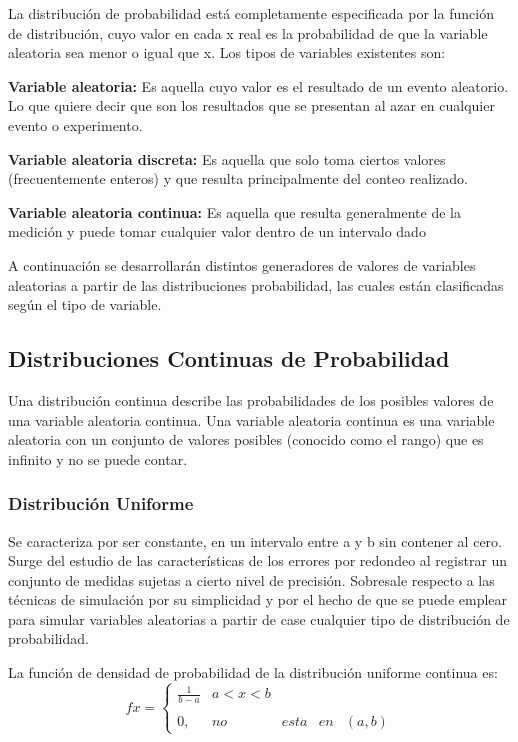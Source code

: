 \documentclass{article}
\begin{document}
    La distribución de probabilidad está completamente especificada por la función de distribución, cuyo valor en cada x
    real es la probabilidad de que la variable aleatoria sea menor o igual que x.
    Los tipos de variables existentes son:
    \item \textbf{Variable aleatoria:} Es aquella cuyo valor es el resultado de un evento aleatorio. Lo que quiere decir que son
    los resultados que se presentan al azar en cualquier evento o experimento.
    \item \textbf{Variable aleatoria discreta:} Es aquella que solo toma ciertos valores (frecuentemente enteros) y que resulta
  principalmente del conteo realizado.
    \item \textbf{Variable aleatoria continua:} Es aquella que resulta generalmente de la medición y puede tomar cualquier valor
    dentro de un intervalo dado

  A continuación se desarrollarán distintos generadores de valores de variables aleatorias a partir de las distribuciones probabilidad, las cuales están clasificadas según el tipo de variable.

  \subsection{Distribuciones Continuas de Probabilidad}
  Una distribución continua describe las probabilidades de los posibles valores de una variable aleatoria continua. Una variable aleatoria continua es una variable aleatoria con un conjunto de valores posibles (conocido como el rango) que es infinito y no se puede contar.

  \subsubsection{Distribución Uniforme}
  Se caracteriza por ser constante, en un intervalo entre a y b sin contener al cero. Surge del estudio de las características de los errores por redondeo al registrar un conjunto de medidas sujetas a cierto nivel de precisión.
  Sobresale respecto a las técnicas de simulación por su simplicidad y por el hecho de que se puede emplear para simular variables aleatorias a partir de case cualquier tipo de distribución de probabilidad.

  La función de densidad de probabilidad de la distribución uniforme continua es:
  \begin{equation}
    f{x} = \left\{\begin{array}{lcc}
                  \frac{1}{b-a} &   a<x<b \\
                  \\0, &no&esta&en&(a, b)
                  \end{array}
    \right.
  \end{equation}
\end{document}
